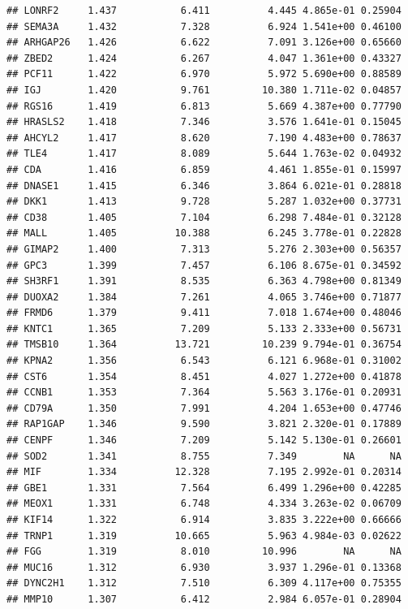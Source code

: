 \documentclass{article}\usepackage[]{graphicx}\usepackage[]{color}
\makeatletter
\newenvironment{kframe}{%
 \def\at@end@of@kframe{}%
 \ifinner\ifhmode%
  \def\at@end@of@kframe{\end{minipage}}%
  \begin{minipage}{\columnwidth}%
 \fi\fi%
 \def\FrameCommand##1{\hskip\@totalleftmargin \hskip-\fboxsep
 \colorbox{shadecolor}{##1}\hskip-\fboxsep
     \hskip-\linewidth \hskip-\@totalleftmargin \hskip\columnwidth}%
 \MakeFramed {\advance\hsize-\width
   \@totalleftmargin\z@ \linewidth\hsize
   \@setminipage}}%
 {\par\unskip\endMakeFramed%
 \at@end@of@kframe}
\newenvironment{knitrout}{}{} %
\makeatother
\begin{document}
\begin{knitrout}
\begin{kframe}
\begin{verbatim}
## LONRF2     1.437           6.411          4.445 4.865e-01 0.25904
## SEMA3A     1.432           7.328          6.924 1.541e+00 0.46100
## ARHGAP26   1.426           6.622          7.091 3.126e+00 0.65660
## ZBED2      1.424           6.267          4.047 1.361e+00 0.43327
## PCF11      1.422           6.970          5.972 5.690e+00 0.88589
## IGJ        1.420           9.761         10.380 1.711e-02 0.04857
## RGS16      1.419           6.813          5.669 4.387e+00 0.77790
## HRASLS2    1.418           7.346          3.576 1.641e-01 0.15045
## AHCYL2     1.417           8.620          7.190 4.483e+00 0.78637
## TLE4       1.417           8.089          5.644 1.763e-02 0.04932
## CDA        1.416           6.859          4.461 1.855e-01 0.15997
## DNASE1     1.415           6.346          3.864 6.021e-01 0.28818
## DKK1       1.413           9.728          5.287 1.032e+00 0.37731
## CD38       1.405           7.104          6.298 7.484e-01 0.32128
## MALL       1.405          10.388          6.245 3.778e-01 0.22828
## GIMAP2     1.400           7.313          5.276 2.303e+00 0.56357
## GPC3       1.399           7.457          6.106 8.675e-01 0.34592
## SH3RF1     1.391           8.535          6.363 4.798e+00 0.81349
## DUOXA2     1.384           7.261          4.065 3.746e+00 0.71877
## FRMD6      1.379           9.411          7.018 1.674e+00 0.48046
## KNTC1      1.365           7.209          5.133 2.333e+00 0.56731
## TMSB10     1.364          13.721         10.239 9.794e-01 0.36754
## KPNA2      1.356           6.543          6.121 6.968e-01 0.31002
## CST6       1.354           8.451          4.027 1.272e+00 0.41878
## CCNB1      1.353           7.364          5.563 3.176e-01 0.20931
## CD79A      1.350           7.991          4.204 1.653e+00 0.47746
## RAP1GAP    1.346           9.590          3.821 2.320e-01 0.17889
## CENPF      1.346           7.209          5.142 5.130e-01 0.26601
## SOD2       1.341           8.755          7.349        NA      NA
## MIF        1.334          12.328          7.195 2.992e-01 0.20314
## GBE1       1.331           7.564          6.499 1.296e+00 0.42285
## MEOX1      1.331           6.748          4.334 3.263e-02 0.06709
## KIF14      1.322           6.914          3.835 3.222e+00 0.66666
## TRNP1      1.319          10.665          5.963 4.984e-03 0.02622
## FGG        1.319           8.010         10.996        NA      NA
## MUC16      1.312           6.930          3.937 1.296e-01 0.13368
## DYNC2H1    1.312           7.510          6.309 4.117e+00 0.75355
## MMP10      1.307           6.412          2.984 6.057e-01 0.28904

\end{verbatim}
\end{kframe}
\end{knitrout}
\end{document}
